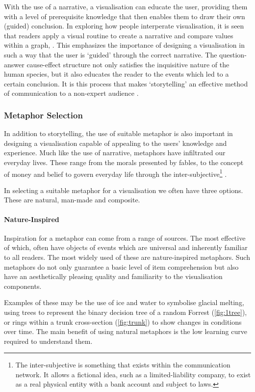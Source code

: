 With the use of a narrative, a visualisation can educate the user, providing them with a level of prerequisite knowledge that then enables them to draw their own (guided) conclusion. In exploring how people interperate visualisation, it is seen that readers apply a visual routine to create a narrative and compare values within a graph, \cite{eyestory}. This emphasizes the importance of designing a visualisation in such a way that the user is `guided' through the correct narrative. The question-answer cause-effect structure not only satisfies the inquisitive nature of the human species, but it also educates the reader to the events which led to a certain conclusion. It is this process that makes `storytelling' an effective method of communication to a non-expert audience \cite{nonscientific}.


\subsubsection{Metaphor Selection}
In addition to storytelling, the use of suitable metaphor is also important in designing a visualisation capable of appealing to the users' knowledge and experience.  Much like the use of narrative, metaphors have infiltrated our everyday lives. These range from the morals presented by fables, to the concept of money and belief to govern everyday life through the inter-subjective\footnote{The inter-subjective is something that exists within the communication network. It allows a fictional idea, such as a limited-liability company, to exist as a real physical entity with a bank account and subject to laws. } \cite{sapiens}. 

In selecting a suitable metaphor for a visualisation we often have three options. These are natural, man-made and composite. 

\paragraph*{Nature-Inspired}
Inspiration for a metaphor can come from a range of sources. The most effective of which, often have objects of events which are universal and inherently familiar to all readers. The most widely used of these are nature-inspired metaphors. 
Such metaphors do not only guarantee a basic level of item comprehension but also have an aesthetically pleasing
quality and familiarity to the visualisation components. 

Examples of these may be the use of ice and water to symbolise glacial melting, using trees to represent the binary decision tree of a random Forrest (\autoref{fig:1tree}), or rings within a trunk cross-section (\autoref{fig:trunk}) to show changes in conditions over time. The main benefit of using natural metaphors is the low learning curve required to understand them. 


